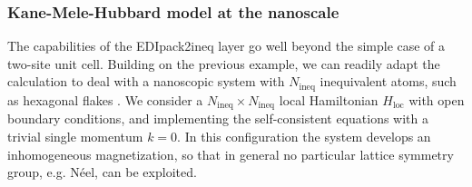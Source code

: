 \documentclass[edipack_sp.tex]{subfiles}
\begin{document}
\subsubsection{Kane-Mele-Hubbard model at the nanoscale}
The capabilities of the EDIpack2ineq layer go well beyond the
simple case of a two-site unit cell. Building on the previous example, we can readily adapt the calculation to deal with a nanoscopic \cite{Amaricci2014PRA} system with $N_\mathrm{ineq}$ inequivalent atoms, such as hexagonal flakes
\cite{Valli2016PRB,Valli2018NL}.
We consider a 
$N_\mathrm{ineq}\times N_\mathrm{ineq}$ local Hamiltonian 
$H_\mathrm{loc}$ with open boundary conditions, and implementing
the self-consistent equations with a trivial single momentum 
$k=0$. In this configuration the system develops an inhomogeneous magnetization, so that in general no particular lattice symmetry group, e.g. N\'eel, can be exploited. 
\end{document}
